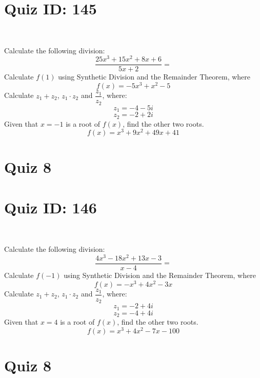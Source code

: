\documentclass{exam}
\begin{document}
\section*{Quiz ID: 145}
\vspace{0.5cm}\
\vspace{1cm}\
\begin{questions}
\question Calculate the following division:\[\dfrac{
25x^3 + 15x^2 + 8x + 6}{
5x + 2}=\] \makeemptybox{\stretch{2}}
\question Calculate $f(1)$ using Synthetic Division and the Remainder Theorem, where\[f(x) = 
-5x^3 + x^2 - 5\]
\newpage\question Calculate $z_1+z_2$, $z_1\cdot z_2$ and $\dfrac{z_1}{z_2}$, where:\[z_1=-4-5\mathit{i}\]\[z_2=-2+2\mathit{i}\]
\question Given that $x=-1$ is a root of $f(x)$, find the other two roots.\[f(x)=
x^3 + 9x^2 + 49x + 41\]\makeemptybox{\stretch{1}}
\end{questions}\newpage
\newpage
\section*{Quiz 8}
\section*{Quiz ID: 146}
\vspace{0.5cm}\
\vspace{1cm}\
\begin{questions}
\question Calculate the following division:\[\dfrac{
4x^3 - 18x^2 + 13x - 3}{
x - 4}=\] 
\question Calculate $f(-1)$ using Synthetic Division and the Remainder Theorem, where\[f(x) = 
-x^3 + 4x^2 - 3x\]
\newpage\question Calculate $z_1+z_2$, $z_1\cdot z_2$ and $\dfrac{z_1}{z_2}$, where:\[z_1=-2+4\mathit{i}\]\[z_2=-4+4\mathit{i}\]\makeemptybox{\stretch{1}}
\question Given that $x=4$ is a root of $f(x)$, find the other two roots.\[f(x)=
x^3 + 4x^2 - 7x - 100\]\makeemptybox{\stretch{1}}
\end{questions}\newpage
\newpage
\section*{Quiz 8}
\end{document}
